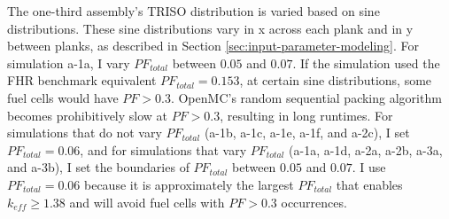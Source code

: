 The one-third assembly's TRISO distribution is varied based on sine distributions. 
These sine distributions vary in x across each plank and in y between planks, 
as described in Section \ref{sec:input-parameter-modeling}. 
For simulation a-1a, I vary $PF_{total}$ between $0.05$ and $0.07$.
If the simulation used the FHR benchmark equivalent $PF_{total} = 0.153$, at
certain sine distributions, some fuel cells would have $PF > 0.3$. 
OpenMC's random sequential packing algorithm becomes prohibitively slow at $PF > 0.3$, 
resulting in long runtimes. 
For simulations that do not vary $PF_{total}$ (a-1b, a-1c, a-1e, a-1f, and a-2c), 
I set $PF_{total} = 0.06$, and for simulations that vary $PF_{total}$ 
(a-1a, a-1d, a-2a, a-2b, a-3a, and a-3b), I set the boundaries of $PF_{total}$ 
between $0.05$ and $0.07$.
I use $PF_{total} = 0.06$ because it is approximately the largest 
$PF_{total}$ that enables $k_{eff} \geq 1.38$ and will avoid fuel cells with 
$PF > 0.3$ occurrences. 

